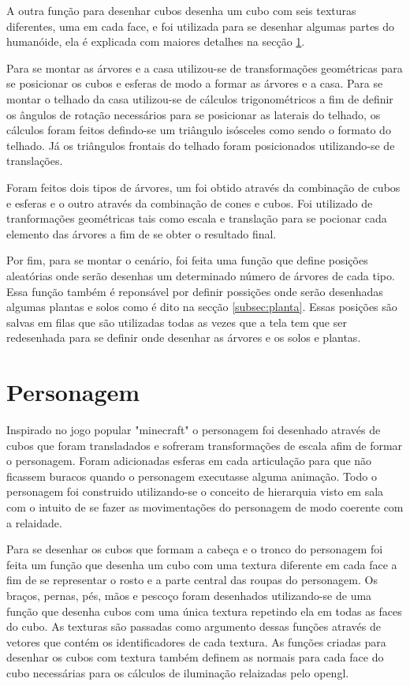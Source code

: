 \documentclass[
	12pt,				%
	openright,			%
	a4paper,			%
	english,			%
	french,				%
	spanish,			%
	brazil,				%
	]{abntex2}
\begin{document}
A outra função para desenhar cubos desenha um cubo com seis texturas diferentes, uma em cada face, e foi utilizada para  se desenhar algumas partes do humanóide, ela é explicada com maiores detalhes na secção \ref{subsec:personagem}.

Para se montar as árvores e a casa utilizou-se de transformações geométricas para se posicionar os cubos e esferas de modo a formar as árvores e a casa.  Para se montar o telhado da casa utilizou-se de cálculos trigonométricos a fim de definir os ângulos de rotação necessários para se posicionar as laterais do telhado, os cálculos foram  feitos defindo-se um triângulo isósceles como sendo o formato do telhado. Já os triângulos frontais do telhado foram posicionados utilizando-se de translações.

Foram feitos dois tipos de árvores, um foi obtido através da combinação de cubos e esferas e o outro através da combinação de cones e cubos. Foi utilizado de tranformações geométricas tais como escala e translação para se pocionar cada elemento das árvores a fim de se obter o resultado final.

Por fim, para se montar o cenário, foi feita uma função que define posições aleatórias onde serão desenhas um determinado número de árvores de cada tipo. Essa função também é reponsável por definir possições onde serão desenhadas algumas plantas e solos como é dito na secção \ref{subsec:planta}. Essas posições são salvas em filas que são utilizadas todas as vezes que a tela tem que ser redesenhada para se definir onde desenhar as árvores e os solos e plantas.

 

   
  

 


\section{Personagem}
\label{subsec:personagem}

 Inspirado no jogo popular "minecraft" o personagem foi desenhado através de cubos que foram transladados e sofreram transformações de escala afim de formar o personagem. Foram adicionadas esferas em cada articulação para que não ficassem buracos quando o personagem executasse alguma animação. Todo o personagem foi construido utilizando-se o conceito de hierarquia visto em sala com o intuito de se fazer as movimentações do personagem de modo coerente com a relaidade. 

Para se desenhar os cubos que formam a cabeça e o tronco do personagem foi feita um função que desenha um cubo com uma textura diferente em cada face a fim de se representar o rosto e a parte central das roupas do personagem. Os braços, pernas, pés, mãos e pescoço foram desenhados utilizando-se de uma função que desenha cubos com uma única textura repetindo ela em todas as faces do cubo. As texturas são passadas como argumento dessas funções através de vetores que contém os identificadores de cada textura. As funções criadas para desenhar os cubos com textura também definem as normais para cada face do cubo necessárias para os cálculos de iluminação relaizadas pelo opengl.
\end{document}
